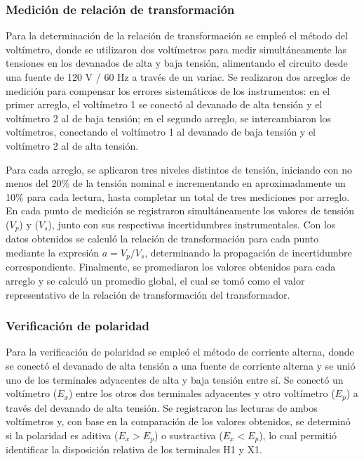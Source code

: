 \subsubsection{Medición de relación de transformación}

Para la determinación de la relación de transformación se empleó el método del voltímetro, donde se utilizaron dos voltímetros para medir simultáneamente las tensiones en los devanados de alta y baja tensión, alimentando el circuito desde una fuente de 120 V / 60 Hz a través de un variac. Se realizaron dos arreglos de medición para compensar los errores sistemáticos de los instrumentos: en el primer arreglo, el voltímetro 1 se conectó al devanado de alta tensión y el voltímetro 2 al de baja tensión; en el segundo arreglo, se intercambiaron los voltímetros, conectando el voltímetro 1 al devanado de baja tensión y el voltímetro 2 al de alta tensión. 

Para cada arreglo, se aplicaron tres niveles distintos de tensión, iniciando con no menos del 20\% de la tensión nominal e incrementando en aproximadamente un 10\% para cada lectura, hasta completar un total de tres mediciones por arreglo. En cada punto de medición se registraron simultáneamente los valores de tensión ($V_p$) y ($V_s$), junto con sus respectivas incertidumbres instrumentales. Con los datos obtenidos se calculó la relación de transformación para cada punto mediante la expresión $a = V_p / V_s$, determinando la propagación de incertidumbre correspondiente. Finalmente, se promediaron los valores obtenidos para cada arreglo y se calculó un promedio global, el cual se tomó como el valor representativo de la relación de transformación del transformador.

\subsubsection{Verificación de polaridad}

Para la verificación de polaridad se empleó el método de corriente alterna, donde se conectó el devanado de alta tensión a una fuente de corriente alterna y se unió uno de los terminales adyacentes de alta y baja tensión entre sí. Se conectó un voltímetro ($E_x$) entre los otros dos terminales adyacentes y otro voltímetro ($E_p$) a través del devanado de alta tensión. Se registraron las lecturas de ambos voltímetros y, con base en la comparación de los valores obtenidos, se determinó si la polaridad es aditiva ($E_x > E_p$) o sustractiva ($E_x < E_p$), lo cual permitió identificar la disposición relativa de los terminales H1 y X1.


